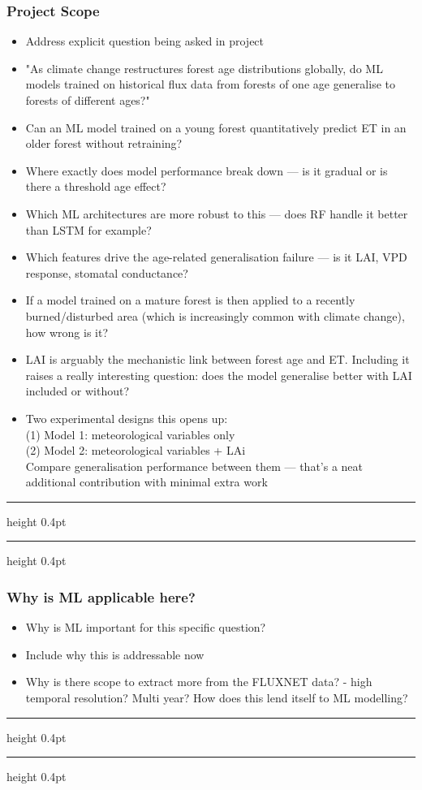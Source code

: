 \documentclass[paper=a4, fontsize=12pt]{scrartcl}
\newcommand{\notedivider}{%
	\vspace{4pt}%
	{\hrule height 0.4pt}%
	\vspace{6pt}%
	{\hrule height 0.4pt}
	\vspace{6pt}
}
\begin{document}
	\subsubsection{Project Scope}
	\begin{itemize}
		\item Address explicit question being asked in project 
		\item "As climate change restructures forest age distributions globally, do ML models trained on historical flux data from forests of one age generalise to forests of different ages?"
		\item Can an ML model trained on a young forest quantitatively predict ET in an older forest without retraining?
		\item Where exactly does model performance break down — is it gradual or is there a threshold age effect?
		\item Which ML architectures are more robust to this — does RF handle it better than LSTM for example?
		\item Which features drive the age-related generalisation failure — is it LAI, VPD response, stomatal conductance?
		\item If a model trained on a mature forest is then applied to a recently burned/disturbed area (which is increasingly common with climate change), how wrong is it?
		\item LAI is arguably the mechanistic link between forest age and ET. Including it raises a really interesting question: does the model generalise better with LAI included or without?
		\item Two experimental designs this opens up:\\
		(1) Model 1: meteorological variables only\\
		(2) Model 2: meteorological variables + LAi\\
		Compare generalisation performance between them — that's a neat additional contribution with minimal extra work
	\end{itemize}
	\notedivider
	
	\newpage
	\subsubsection{Why is ML applicable here?}
	\begin{itemize}
		\item Why is ML important for this specific question?
		\item Include why this is addressable now
		\item Why is there scope to extract more from the FLUXNET data? - high temporal resolution? Multi year? How does this lend itself to ML modelling?
	\end{itemize}
	\notedivider
	
\end{document}
